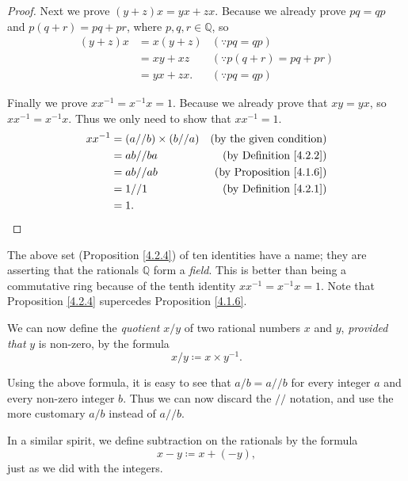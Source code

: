 \begin{proof}
Next we prove \((y + z)x = yx + zx\).
Because we already prove \(pq = qp\) and \(p(q + r) = pq + pr\), where \(p, q, r \in \mathds{Q}\),
so
\begin{align*}
(y + z)x &= x(y + z) & (\because pq = qp) \\
&= xy + xz & (\because p(q + r) = pq + pr) \\
&= yx + zx. & (\because pq = qp)
\end{align*}

Finally we prove \(xx^{-1} = x^{-1}x = 1\).
Because we already prove that \(xy = yx\), so \(xx^{-1} = x^{-1}x\).
Thus we only need to show that \(xx^{-1} = 1\).
\begin{align*}
xx^{-1} &= (a // b) \times (b // a) & \text{(by the given condition)} \\
&= ab // ba & \text{(by Definition \ref{4.2.2})} \\
&= ab // ab & \text{(by Proposition \ref{4.1.6})} \\
&= 1 // 1  & \text{(by Definition \ref{4.2.1})} \\
&= 1.
\end{align*}
\end{proof}

\begin{remark}\label{4.2.5}
The above set (Proposition \ref{4.2.4}) of ten identities have a name;
they are asserting that the rationals \(\mathds{Q}\) form a \emph{field}.
This is better than being a commutative ring because of the tenth identity \(xx^{-1} = x^{-1}x = 1\).
Note that Proposition \ref{4.2.4} supercedes Proposition \ref{4.1.6}.
\end{remark}

\begin{note}
We can now define the \emph{quotient} \(x / y\) of two rational numbers \(x\) and \(y\), \emph{provided that} \(y\) is non-zero, by the formula
\[
    x / y \coloneqq x \times y^{-1}.
\]
\end{note}

\begin{note}
Using the above formula, it is easy to see that \(a / b = a // b\) for every integer \(a\) and every non-zero integer \(b\).
Thus we can now discard the \(//\) notation, and use the more customary \(a / b\) instead of \(a // b\).
\end{note}

\begin{note}
In a similar spirit, we define subtraction on the rationals by the formula
\[
    x - y \coloneqq x + (-y),
\]
just as we did with the integers.
\end{note}

